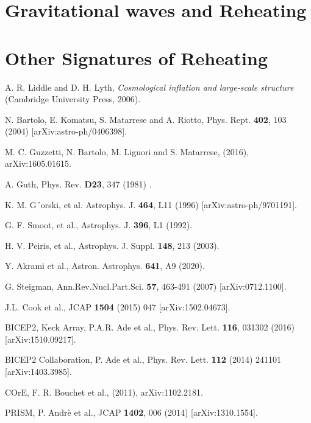 \documentclass[11pt,a4paper,twoside]{book}
\begin{document}
\chapter{Gravitational waves and Reheating}

\chapter{Other Signatures of Reheating}

\begin{thebibliography}{2}
	
	 A. R. Liddle and D. H. Lyth, \emph{Cosmological inflation and large-scale structure} (Cambridge University Press, 2006).
	
	 N. Bartolo, E. Komatsu, S. Matarrese and A. Riotto, Phys. Rept. \textbf{402}, 103 (2004) [arXiv:astro-ph/0406398].
	
	 M. C. Guzzetti, N. Bartolo, M. Liguori and S. Matarrese, (2016), arXiv:1605.01615. 
	
	 A. Guth, Phys. Rev. \textbf{D23}, 347 (1981) .
	
	 K. M. G´orski, et al. Astrophys. J. \textbf{464}, L11 (1996) [arXiv:astro-ph/9701191].
	
	 G. F. Smoot, et al., Astrophys. J. \textbf{396}, L1 (1992).

     H. V. Peiris, et al., Astrophys. J. Suppl. \textbf{148}, 213 (2003).
	
	 Y. Akrami et al., Astron. Astrophys. \textbf{641}, A9 (2020).
	
	 G. Steigman, Ann.Rev.Nucl.Part.Sci. \textbf{57}, 463-491 (2007) [arXiv:0712.1100].
	
	 J.L. Cook et al., JCAP \textbf{1504} (2015) 047 [arXiv:1502.04673].
	
	 BICEP2, Keck Array, P.A.R. Ade et al., Phys. Rev. Lett. \textbf{116}, 031302 (2016) [arXiv:1510.09217].
	
	 BICEP2 Collaboration, P. Ade et al., Phys. Rev. Lett. \textbf{112} (2014) 241101 [arXiv:1403.3985].
	
	 COrE, F. R. Bouchet et al., (2011), arXiv:1102.2181.  
	
	 PRISM, P. Andrè et al., JCAP \textbf{1402}, 006 (2014) [arXiv:1310.1554].
	

\end{thebibliography}
\end{document}
